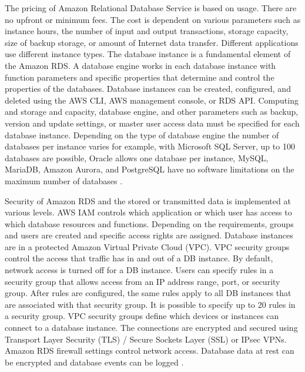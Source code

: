 \par The pricing of Amazon Relational Database Service is based on usage. There are no upfront or minimum fees. The cost is dependent on various parameters such as instance hours, the number of input and output transactions, storage capacity, size of backup storage, or amount of Internet data transfer. Different applications use different instance types. The database instance is a fundamental element of the Amazon RDS. A database engine works in each database instance with function parameters and specific properties that determine and control the properties of the databases. Database instances can be created, configured, and deleted using the AWS CLI, AWS management console, or RDS API. Computing and storage and capacity, database engine, and other parameters such as backup, version and update settings, or master user access data must be specified for each database instance. Depending on the type of database engine the number of databases per instance varies for example, with Microsoft SQL Server, up to 100 databases are possible, Oracle allows one database per instance, MySQL, MariaDB, Amazon Aurora, and PostgreSQL have no software limitations on the maximum number of databases \cite{35}.

\par Security of Amazon RDS and the stored or transmitted data is implemented at various levels. AWS IAM controls which application or which user has access to which database resources and functions. Depending on the requirements, groups and users are created and specific access rights are assigned. Database instances are in a protected Amazon Virtual Private Cloud (VPC). VPC security groups control the access that traffic has in and out of a DB instance. By default, network access is turned off for a DB instance. Users can specify rules in a security group that allows access from an IP address range, port, or security group. After rules are configured, the same rules apply to all DB instances that are associated with that security group. It is possible to specify up to 20 rules in a security group. VPC security groups define which devices or instances can connect to a database instance. The connections are encrypted and secured using Transport Layer Security (TLS) / Secure Sockets Layer (SSL) or IPsec VPNs. Amazon RDS firewall settings control network access. Database data at rest can be encrypted and database events can be logged \cite{71}.

